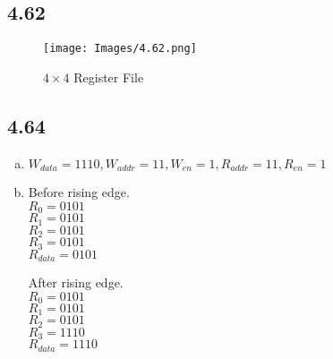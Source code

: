 \clearpage
\subsection*{4.62}
\begin{figure}[!ht]
    \centering
    \texttt{[image: Images/4.62.png]}
    \caption{$4\times4$ Register File}
\end{figure}

\subsection*{4.64}
\begin{enumerate}[(a)]
    \item $W_{data}=1110,W_{addr}=11,W_{en}=1,R_{addr}=11,R_{en}=1$
    \item Before rising edge.\\
    $R_0=0101$\\
    $R_1=0101$\\
    $R_2=0101$\\
    $R_3=0101$\\
    $R_{data}=0101$
    
    \noindent
    After rising edge.\\
    $R_0=0101$\\
    $R_1=0101$\\
    $R_2=0101$\\
    $R_3=1110$\\
    $R_{data}=1110$\\
\end{enumerate}